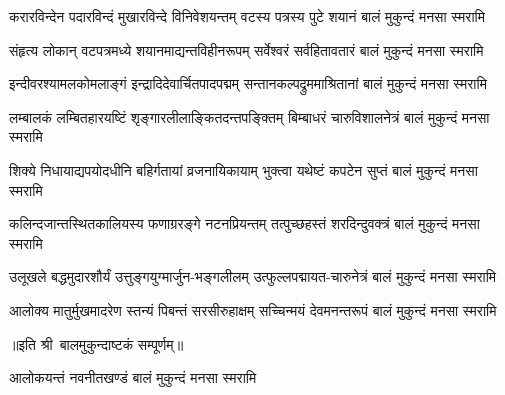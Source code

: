 

\twolineshloka
{करारविन्देन पदारविन्दं मुखारविन्दे विनिवेशयन्तम्‌}
{वटस्य पत्रस्य पुटे शयानं बालं मुकुन्दं मनसा स्मरामि}%

\twolineshloka
{संहृत्य लोकान् वटपत्रमध्ये शयानमाद्यन्तविहीनरूपम्}
{सर्वेश्वरं सर्वहितावतारं बालं मुकुन्दं मनसा स्मरामि}%

\twolineshloka
{इन्दीवरश्यामलकोमलाङ्गं इन्द्रादिदेवार्चितपादपद्मम्‌}
{सन्तानकल्पद्रुममाश्रितानां बालं मुकुन्दं मनसा स्मरामि}%

\twolineshloka
{लम्बालकं लम्बितहारयष्टिं शृङ्गारलीलाङ्कितदन्तपङ्क्तिम्}
{बिम्बाधरं चारुविशालनेत्रं बालं मुकुन्दं मनसा स्मरामि}%

\twolineshloka
{शिक्ये निधायाद्यपयोदधीनि बहिर्गतायां व्रजनायिकायाम्‌}
{भुक्त्वा यथेष्टं कपटेन सुप्तं बालं मुकुन्दं मनसा स्मरामि}%

\twolineshloka
{कलिन्दजान्तस्थितकालियस्य फणाग्ररङ्गे नटनप्रियन्तम्‌}
{तत्पुच्छहस्तं शरदिन्दुवक्त्रं बालं मुकुन्दं मनसा स्मरामि}%

\twolineshloka
{उलूखले बद्धमुदारशौर्यं उत्तुङ्गयुग्मार्जुन-भङ्गलीलम्‌}
{उत्फुल्लपद्मायत-चारुनेत्रं बालं मुकुन्दं मनसा स्मरामि}%

\twolineshloka
{आलोक्य मातुर्मुखमादरेण स्तन्यं पिबन्तं सरसीरुहाक्षम्‌}
{सच्चिन्मयं देवमनन्तरूपं बालं मुकुन्दं मनसा स्मरामि}%

॥इति श्री~बालमुकुन्दाष्टकं सम्पूर्णम्‌॥

{आलोकयन्तं नवनीतखण्डं बालं मुकुन्दं मनसा स्मरामि}%